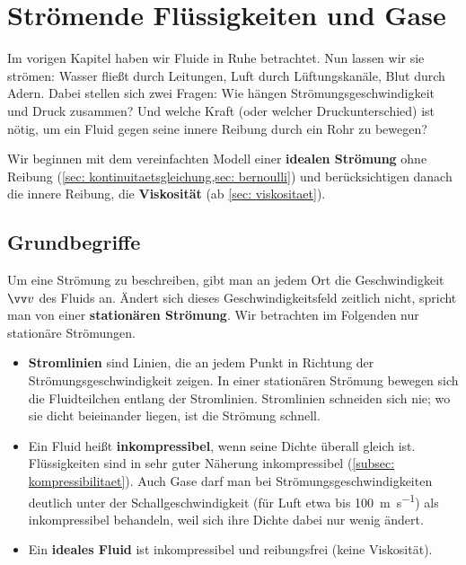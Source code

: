 \chapter{Strömende Flüssigkeiten und Gase}\label{chap: stroemende_fluide}
Im vorigen Kapitel haben wir Fluide in Ruhe betrachtet. Nun lassen wir sie strömen: Wasser fließt durch Leitungen, Luft durch Lüftungskanäle, Blut durch Adern. Dabei stellen sich zwei Fragen: Wie hängen Strömungsgeschwindigkeit und Druck zusammen? Und welche Kraft (oder welcher Druckunterschied) ist nötig, um ein Fluid gegen seine innere Reibung durch ein Rohr zu bewegen?

Wir beginnen mit dem vereinfachten Modell einer \textbf{idealen Strömung} ohne Reibung (\cref{sec: kontinuitaetsgleichung,sec: bernoulli}) und berücksichtigen danach die innere Reibung, die \textbf{Viskosität} (ab \cref{sec: viskositaet}).

\section{Grundbegriffe}\label{sec: stroemung_grundbegriffe}
Um eine Strömung zu beschreiben, gibt man an jedem Ort die Geschwindigkeit $\ivec{v}$ des Fluids an. Ändert sich dieses Geschwindigkeitsfeld zeitlich nicht, spricht man von einer \textbf{stationären Strömung}. Wir betrachten im Folgenden nur stationäre Strömungen.

\begin{itemize}[itemsep=1.5pt]
    \item \textbf{Stromlinien} sind Linien, die an jedem Punkt in Richtung der Strömungsgeschwindigkeit zeigen. In einer stationären Strömung bewegen sich die Fluidteilchen entlang der Stromlinien. Stromlinien schneiden sich nie; wo sie dicht beieinander liegen, ist die Strömung schnell.
    \item Ein Fluid heißt \textbf{inkompressibel}, wenn seine Dichte überall gleich ist. Flüssigkeiten sind in sehr guter Näherung inkompressibel (\cref{subsec: kompressibilitaet}). Auch Gase darf man bei Strömungsgeschwindigkeiten deutlich unter der Schallgeschwindigkeit (für Luft etwa bis \SI{100}{\meter\per\second}) als inkompressibel behandeln, weil sich ihre Dichte dabei nur wenig ändert.
    \item Ein \textbf{ideales Fluid} ist inkompressibel und reibungsfrei (keine Viskosität).
\end{itemize}

